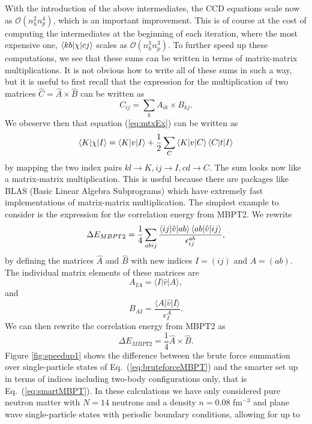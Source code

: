   With the introduction of the above intermediates, the CCD equations scale now as $\mathcal{O}(n_{h}^{2}
  n_{p}^{4})$, which is an important improvement. This is of
  course at the cost of computing the intermediates at the beginning
  of each iteration, where the most expensive one, $\braket{kb| \chi |cj}$ scales as $\mathcal{O}(n_{h}^{3} n_{p}^{3})$. To
  further speed up these computations, we see that these sums can be
  written in terms of  matrix-matrix multiplications. It is not obvious how to
  write all of these sums in such a way, but it is useful to first
  recall that the expression for the multiplication of two matrices $\hat{C} =
  \hat{A}\times \hat{B}$ can be written as
  \begin{equation}
  C_{ij} = \sum_{k} A_{ik} \times B_{kj}.
  \end{equation}
  We obeserve then  that equation (\ref{eq:mtxEx}) can be written as
  \[
  \braket{K| \chi |I} = \braket{K|v|I} + \frac{1}{2} \sum_{C}
  \braket{K|v|C} \braket{C|t|I}
  \]
  by mapping the two index pairs $kl \to K, ij \to I, cd \to C$. The sum looks now 
like a matrix-matrix multiplication. This is
  useful because there are packages like BLAS (Basic Linear Algebra
  Subprograms) \cite{blas} which have extremely fast implementations of
  matrix-matrix multiplication.
  The simplest example to consider is the expression for the correlation energy from MBPT2. We rewrite 
  \begin{equation}\label{eq:bruteforceMBPT}
  \Delta E_{MBPT2} = \frac{1}{4}\sum_{abij} \frac{\braket{ij|\hat{v}|ab}\braket{ab|\hat{v}|ij}}{ \epsilon_{ij}^{ab}},
\end{equation}
by defining the matrices $\hat{A}$ and $\hat{B}$ with new indices $I=(ij)$ and $A=(ab)$. The individual matrix elements of these matrices are 
\[
A_{IA} = \langle I \vert \hat{v} \vert A \rangle,
\]
and 
\[
B_{AI} = \frac{\langle A \vert \hat{v} \vert I \rangle}{\epsilon^A_I}.
\]
We can then rewrite the correlation energy from MBPT2 as
\begin{equation}\label{eq:smartMBPT}
  \Delta E_{MBPT2} = \frac{1}{4}\hat{A}\times \hat{B}.
\end{equation}
Figure \ref{fig:speedup1} shows the difference between the brute force summation over single-particle states
of Eq.~(\ref{eq:bruteforceMBPT}) and the smarter set up in terms of indices including two-body configurations only, that is Eq.~(\ref{eq:smartMBPT}).
In these calculations we have only considered pure neutron matter with $N=14$ neutrons and a density $n=0.08$ fm$^{-3}$ and plane wave single-particle states with periodic boundary conditions, allowing for up to 
